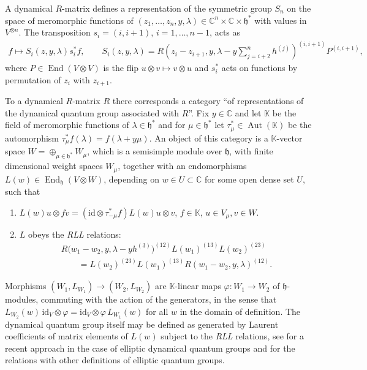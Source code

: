 \documentclass[10pt,a4paper]{amsart}
\numberwithin{equation}{section}
\begin{document}
A dynamical $R$-matrix defines a representation of the symmetric group $S_n$ on the space of meromorphic functions of $(z_1,\dots,z_n,y,\lambda)\in\mathbb C^n\times \mathbb C\times\mathfrak h^*$ with values in $V^{\otimes n}$. The transposition $s_i=(i,i+1)$, $i=1,\dots,n-1$, acts as
\begin{gather}\label{e-Si}
f\mapsto S_i(z,y,\lambda)s_i^*f,\qquad S_i(z,y,\lambda)=R(z_i-z_{i+1},y,\lambda-y\sum_{j={i+2}}^{n}h^{(j)})^{(i,i+1)} P^{(i,i+1)},
\end{gather}
where $P\in\operatorname{End}(V\otimes V)$ is the flip $u\otimes v\mapsto v\otimes u$ and $s_i^*$ acts on functions by permutation of $z_i$ with $z_{i+1}$.

To a dynamical $R$-matrix $R$ there corresponds a category ``of representations of the dynamical quantum group associated with $R$''. Fix $y\in\mathbb C$ and let $\mathbb K$ be the field of meromorphic functions of $\lambda\in\mathfrak h^*$ and for $\mu\in\mathfrak h^*$ let $\tau_\mu^*\in\operatorname{Aut}(\mathbb K)$ be the automorphism $\tau_\mu^*f(\lambda)=f(\lambda+y\mu)$. An object of this category is a $\mathbb K$-vector space $W=\oplus_{\mu\in\mathfrak h^*}W_\mu$, which is a semisimple module over $\mathfrak h$, with finite dimensional weight spaces $W_\mu$, together with an endomorphisms $L(w)\in\operatorname{End}_{\mathfrak h}(V\otimes W)$, depending on $w\in U\subset\mathbb C$ for some open dense set $U$, such that
\begin{enumerate}\itemsep=0pt
\item[(i)] $L(w)u\otimes fv=(\mathrm{id}\otimes\tau^*_{-\mu}f) L(w)u\otimes v$, $f\in \mathbb K$, $u\in V_\mu,v\in W$.
\item[(ii)] $L$ obeys the {\it RLL} relations:
 \begin{gather*}
 R\big(w_1-w_2,y,\lambda-y h^{(3)}\big)^{(12)}L(w_1)^{(13)} L(w_2)^{(23)} \\
 \qquad {}= L(w_2)^{(23)}L(w_1)^{(13)} R(w_1-w_2,y,\lambda)^{(12)}.
 \end{gather*}
\end{enumerate}
Morphisms $(W_1,L_{W_1})\to (W_2,L_{W_2})$ are $\mathbb K$-linear maps $\varphi\colon W_1\to W_2$ of $\mathfrak h$-modules, commuting with the action of the generators, in the sense that $L_{W_2}(w)\,\mathrm{id}_V\otimes \varphi=\mathrm{id}_V\otimes \varphi\, L_{W_1}(w)$ for all $w$ in the domain of definition. The dynamical quantum group itself may be defined as generated by Laurent coefficients of matrix elements of $L(w)$ subject to the {\em RLL} relations, see \cite{Konno} for a recent approach in the case of elliptic dynamical quantum groups and for the relations with other definitions of elliptic quantum groups.
\end{document}
